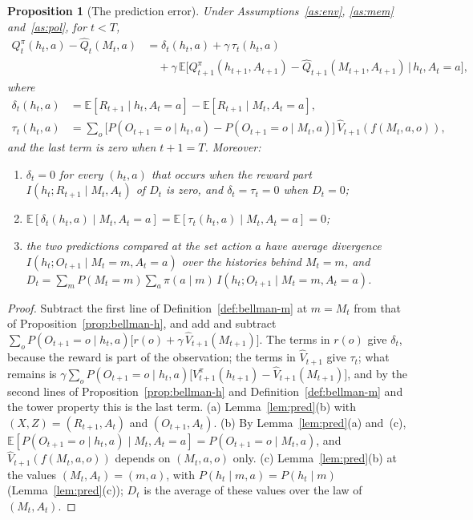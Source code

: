\documentclass{article}
\newtheorem{proposition}{Proposition}[section]
\theoremstyle{definition}
\theoremstyle{remark}
\newcommand{\E}{\mathbb{E}}
\begin{document}
\begin{proposition}[The prediction error]\label{prop:gap}
Under Assumptions~\ref{as:env}, \ref{as:mem} and~\ref{as:pol}, for $t<T$,
\begin{align*}
Q^\pi_t(h_t,a)-\hat Q_t(M_t,a)&=\delta_t(h_t,a)+\gamma\,\tau_t(h_t,a)\\
&\quad+\gamma\,\E\big[Q^\pi_{t+1}(h_{t+1},A_{t+1})-\hat Q_{t+1}(M_{t+1},A_{t+1})\,\big|\,h_t,A_t=a\big],
\end{align*}
where
\begin{align*}
\delta_t(h_t,a)&=\E[R_{t+1}\mid h_t,A_t=a]-\E[R_{t+1}\mid M_t,A_t=a],\\
\tau_t(h_t,a)&=\sum_o\big[P(O_{t+1}=o\mid h_t,a)-P(O_{t+1}=o\mid M_t,a)\big]\,\hat V_{t+1}(f(M_t,a,o)),
\end{align*}
and the last term is zero when $t+1=T$. Moreover:
\begin{enumerate}
\item[(a)] $\delta_t=0$ for every $(h_t,a)$ that occurs when the reward part $I(h_t;R_{t+1}\mid M_t,A_t)$ of $D_t$ is zero, and $\delta_t=\tau_t=0$ when $D_t=0$;
\item[(b)] $\E[\delta_t(h_t,a)\mid M_t,A_t=a]=\E[\tau_t(h_t,a)\mid M_t,A_t=a]=0$;
\item[(c)] the two predictions compared at the set action $a$ have average divergence $I(h_t;O_{t+1}\mid M_t=m,A_t=a)$ over the histories behind $M_t=m$, and $D_t=\sum_mP(M_t=m)\sum_a\pi(a\mid m)\,I(h_t;O_{t+1}\mid M_t=m,A_t=a)$.
\end{enumerate}
\end{proposition}

\begin{proof}
Subtract the first line of Definition~\ref{def:bellman-m} at $m=M_t$ from that of Proposition~\ref{prop:bellman-h}, and add and subtract $\sum_oP(O_{t+1}=o\mid h_t,a)\big[r(o)+\gamma\,\hat V_{t+1}(M_{t+1})\big]$. The terms in $r(o)$ give $\delta_t$, because the reward is part of the observation; the terms in $\hat V_{t+1}$ give $\tau_t$; what remains is $\gamma\sum_oP(O_{t+1}=o\mid h_t,a)\big[V^\pi_{t+1}(h_{t+1})-\hat V_{t+1}(M_{t+1})\big]$, and by the second lines of Proposition~\ref{prop:bellman-h} and Definition~\ref{def:bellman-m} and the tower property this is the last term. (a) Lemma~\ref{lem:pred}(b) with $(X,Z)=(R_{t+1},A_t)$ and $(O_{t+1},A_t)$. (b) By Lemma~\ref{lem:pred}(a) and~(c), $\E[P(O_{t+1}=o\mid h_t,a)\mid M_t,A_t=a]=P(O_{t+1}=o\mid M_t,a)$, and $\hat V_{t+1}(f(M_t,a,o))$ depends on $(M_t,a,o)$ only. (c) Lemma~\ref{lem:pred}(b) at the values $(M_t,A_t)=(m,a)$, with $P(h_t\mid m,a)=P(h_t\mid m)$ (Lemma~\ref{lem:pred}(c)); $D_t$ is the average of these values over the law of $(M_t,A_t)$.
\end{proof}
\end{document}
